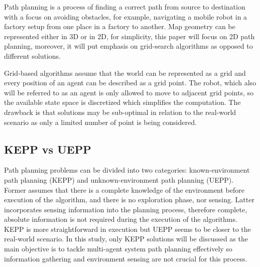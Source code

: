 Path planning is a process of finding a correct path from source to destination with a focus on avoiding obstacles, for example, navigating a mobile robot in a factory setup from one place in a factory to another\cite{path_planning}. Map geometry can be represented either in 3D or in 2D, for simplicity, this paper will focus on 2D path planning, moreover, it will put emphasis on grid-search algorithms as opposed to different solutions.

Grid-based algorithms assume that the world can be represented as a grid and every position of an agent can be described as a grid point. The robot, which also will be referred to as an agent is only allowed to move to adjacent grid points, so the available state space is discretized which simplifies the computation. The drawback is that solutions may be sub-optimal in relation to the real-world scenario as only a limited number of point is being considered\cite{SARANYA2014766}.

\subsection{KEPP vs UEPP}
Path planning problems can be divided into two categories: known-environment path planning
(KEPP) and unknown-environment path planning (UEPP). Former assumes that there is a complete knowledge of the environment before execution of the algorithm, and there is no exploration phase, nor sensing. Latter incorporates sensing information into the planning process, therefore complete, absolute information is not required during the execution of the algorithms. KEPP is more straightforward in execution but UEPP seems to be closer to the real-world scenario. In this study, only KEPP solutions will be discussed as the main objective is to tackle multi-agent system path planning effectively so information gathering and environment sensing are not crucial for this process\cite{path_planning_protocols}.